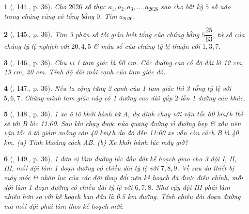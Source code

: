\documentclass{article}
\newtheorem{baitoan}{}
\begin{document}
\begin{baitoan}[\cite{Tuyen_Toan_7}, 144., p. 36]
	Cho $2026$ số thực $a_1,a_2,a_3,\ldots,a_{2026}$ sao cho bất kỳ $5$ số nào trong chúng cũng có tổng bằng $0$. Tìm $a_{2026}$.
\end{baitoan}

\begin{baitoan}[\cite{Tuyen_Toan_7}, 145., p. 36]
	Tìm 3 phân số tối giản biết tổng của chúng bằng $5\dfrac{25}{63}$, tử số của chúng tỷ lệ nghịch với $20,4,5$ \& mẫu số của chúng tỷ lệ thuận với $1,3,7$.
\end{baitoan}

\begin{baitoan}[\cite{Tuyen_Toan_7}, 146., p. 36]
	Chu vi 1 tam giác là {\rm60 cm}. Các đường cao có độ dài là {\rm12 cm, 15 cm, 20 cm}. Tính độ dài mỗi cạnh của tam giác đó.
\end{baitoan}

\begin{baitoan}[\cite{Tuyen_Toan_7}, 147., p. 36]
	Nếu ta cộng từng 2 cạnh của 1 tam giác thì 3 tổng tỷ lệ với $5,6,7$. Chứng minh tam giác này có 1 đường cao dài gấp $2$ lần 1 đường cao khác.
\end{baitoan}

\begin{baitoan}[\cite{Tuyen_Toan_7}, 148., p. 36]
	1 xe ô tô khởi hành từ A, dự định chạy với vận tốc {\rm60 km{\tt/}h} thì sẽ tới B lúc 11:00. Sau khi chạy được nửa quãng đường vì đường hẹp \& xấu nên vận tốc ô tô giảm xuống còn {\rm40 km{\tt/}h} do đó đến 11:00 xe vẫn còn cách B là {\rm40 km}. (a) Tính khoảng cách AB. (b) Xe khởi hành lúc mấy giờ?
\end{baitoan}

\begin{baitoan}[\cite{Tuyen_Toan_7}, 149., p. 36]
	1 đơn vị làm đường lúc đầu đặt kế hoạch giao cho 3 đội I, II, III, mỗi đội làm 1 đoạn đường có chiều dài tỷ lệ với $7,8,9$. Về sau do thiết bị máy móc \& nhân lực của các đội thay đổi nên kế hoạch đã được điều chỉnh, mỗi đội làm 1 đoạn đường có chiều dài tỷ lệ với $6,7,8$. Như vậy đội III phải làm nhiều hơn so với kế hoạch ban đầu là {\rm0.5 km} đường. Tính chiều dài đoạn đường mà mỗi đội phải làm theo kế hoạch mới.
\end{baitoan}


\printbibliography[heading=bibintoc]
	
\end{document}
